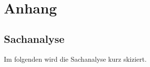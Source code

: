 \documentclass[
11pt,
captions=tableheading,
headsepline,
footsepline, 
captions=tableheading,
parskip=half-,
]{scrartcl}
\begin{document}
\clearpage
{}

\printbibliography
\clearpage
\section*{Anhang}





%
\subsection*{Sachanalyse}
\label{sec:Sachanalyse}
Im folgenden wird die Sachanalyse kurz skiziert.
\end{document}
